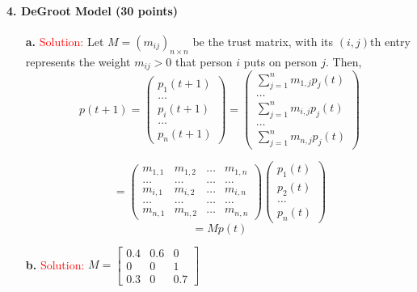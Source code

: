 \documentclass[11pt]{article} %
\begin{document}
\paragraph{4. DeGroot Model (30 points)} 
 
\begin{itemize}
\item[\textbf{a. }]  
\textcolor{red}{Solution:}
Let $M=(m_{ij})_{n\times n} $ be the trust matrix, with its $(i, j)$th entry represents the weight $m_{ij}>0$ that person $i$ puts on person $j$. Then,
$$p(t+1)=\left( \begin{array}{c}
p_1(t+1)\\
\hdots \\
p_i(t+1)\\
\hdots  \\
p_n(t+1)
\end{array}\right) =\left( \begin{array}{c}
\sum_{j=1}^n m_{1,j}p_j(t) \\
\hdots \\
\sum_{j=1}^n m_{i,j}p_j(t) \\
\hdots \\
\sum_{j=1}^n m_{n,j}p_j(t) 
\end{array}\right) $$

$$=\left( \begin{array}{cccc}
m_{1,1} & m_{1,2} &  \hdots & m_{1,n} \\
\hdots & \hdots & \hdots & \hdots   \\ 
m_{i,1} & m_{i,2} & \hdots & m_{i,n} \\
\hdots & \hdots & \hdots & \hdots \\
m_{n,1} & m_{n,2} &  \hdots & m_{n,n} 
\end{array}\right) 
\left( \begin{array}{c}
p_1(t) \\
p_2(t) \\
\hdots \\
p_n(t)
\end{array}\right)  $$
$$=M p(t)$$ 


\item[\textbf{b. }]  
\textcolor{red}{Solution:}
$M=\left[ \begin{array}{ccc}
0.4 & 0.6 & 0 \\
0 & 0 & 1  \\
0.3 &  0  & 0.7   \end{array} \right]$




\end{itemize}
\end{document}
